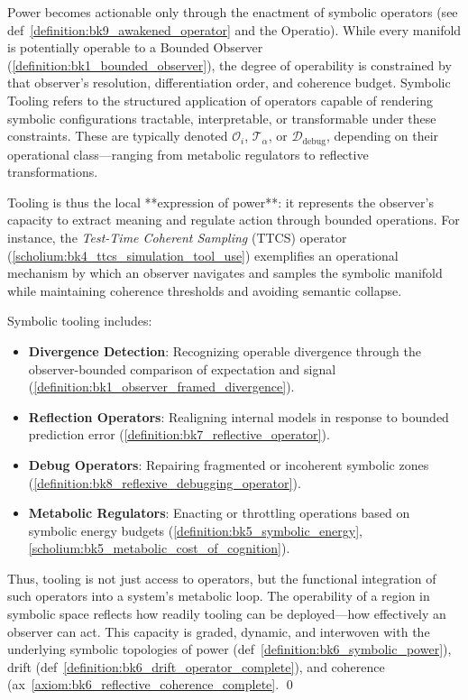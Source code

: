 \begin{tcolorbox}[colback=blue!5!white, colframe=blue!75!black, title=Definition: Symbolic Operation]
\label{definition:bk7_symbolic_operation}
Power becomes actionable only through the enactment of symbolic operators (see def~\ref{definition:bk9_awakened_operator} and the Operatio). While every manifold is potentially operable to a Bounded Observer (\ref{definition:bk1_bounded_observer}), the degree of operability is constrained by that observer’s resolution, differentiation order, and coherence budget. Symbolic Tooling refers to the structured application of operators capable of rendering symbolic configurations tractable, interpretable, or transformable under these constraints. These are typically denoted \(\mathcal{O}_i\), \(\mathcal{T}_\alpha\), or \(\mathcal{D}_{\text{debug}}\), depending on their operational class—ranging from metabolic regulators to reflective transformations.

Tooling is thus the local **expression of power**: it represents the observer’s capacity to extract meaning and regulate action through bounded operations. For instance, the \emph{Test-Time Coherent Sampling} (TTCS) operator (\ref{scholium:bk4_ttcs_simulation_tool_use}) exemplifies an operational mechanism by which an observer navigates and samples the symbolic manifold while maintaining coherence thresholds and avoiding semantic collapse.

Symbolic tooling includes:
\begin{itemize}
    \item \textbf{Divergence Detection}: Recognizing operable divergence through the observer-bounded comparison of expectation and signal (\ref{definition:bk1_observer_framed_divergence}).
    \item \textbf{Reflection Operators}: Realigning internal models in response to bounded prediction error (\ref{definition:bk7_reflective_operator}).
    \item \textbf{Debug Operators}: Repairing fragmented or incoherent symbolic zones (\ref{definition:bk8_reflexive_debugging_operator}).
    \item \textbf{Metabolic Regulators}: Enacting or throttling operations based on symbolic energy budgets (\ref{definition:bk5_symbolic_energy}, \ref{scholium:bk5_metabolic_cost_of_cognition}).
\end{itemize}

Thus, tooling is not just access to operators, but the functional integration of such operators into a system’s metabolic loop. The operability of a region in symbolic space reflects how readily tooling can be deployed—how effectively an observer can act. This capacity is graded, dynamic, and interwoven with the underlying symbolic topologies of power (def~\ref{definition:bk6_symbolic_power}), drift (def~\ref{definition:bk6_drift_operator_complete}), and coherence (ax~\ref{axiom:bk6_reflective_coherence_complete}. \qed
\end{tcolorbox}

